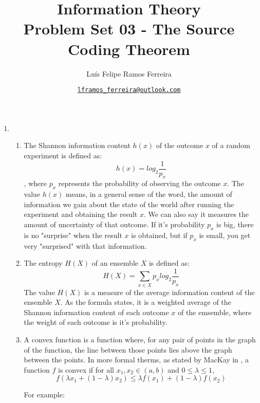 \documentclass{article}
\title{Information Theory \\ \large Problem Set 03 - The Source Coding Theorem}
\author{Luís Felipe Ramos Ferreira}
\date{\href{mailto:lframos\_ferreira@outlook.com}{\texttt{lframos\_ferreira@outlook.com}}
}
\begin{document}
\maketitle

\begin{enumerate}

	\item \begin{enumerate}
		      \item The Shannon information content \(h(x)\) of the outcome \(x\) of a random experiment is defined as:
		            \[ h(x) = log_2 \frac{1}{p_x}\],
		            where \(p_x\) represents the probability of observing the outcome \(x\). The value \(h(x)\) means, in a general sense of the word, the amount of information we gain about the state of the world after running the experiment and obtaining the result \(x\). We can also say it measures the amount of uncertainty of that outcome. If it's probability \(p_x\) is big, there is no "surprise" when the result \(x\) is obtained, but if \(p_x\) is small, you get very "surprised" with that information.
		      \item The entropy \(H(X)\) of an ensemble \(X\) is defined as:
		            \[H(X) = \sum_{x \in X} p_x log_2 \frac{1}{p_x}\]
		            The value \(H(X)\) is a measure of the average information content of the ensemble \(X\). As the formula states, it is a weighted average of the Shannon information content of each outcome \(x\) of the emsemble, where the weight of each outcome is it's probability.
		      \item A convex function is a function where, for any pair of points in the graph of the function, the line between those points lies above the graph between the points. In more formal therms, as stated by MacKay in \cite{MacKay}, a function \(f\) is convex if for all \(x_1, x_2 \in (a, b)\) and \(0 \leq \lambda \leq 1\),
		            \[f(\lambda x_1 + (1 - \lambda)x_2) \leq \lambda f(x_1) + (1 - \lambda) f(x_2)\]

		            For example:


\end{enumerate}
\end{enumerate}
\end{document}
